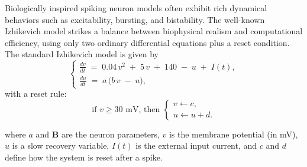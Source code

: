 Biologically inspired spiking neuron models often exhibit rich dynamical behaviors such as excitability, bursting, and bistability. The well-known Izhikevich model \cite{izhikevich2003simple} strikes a balance between biophysical realism and computational efficiency, using only two ordinary differential equations plus a reset condition. The standard Izhikevich model is given by
\begin{equation}
\begin{cases}
\displaystyle \frac{dv}{dt} \;=\; 0.04\,v^2 \;+\; 5\,v \;+\; 140 \;-\; u \;+\; I(t), \\[6pt]
\displaystyle \frac{du}{dt} \;=\; a\,\bigl(b\,v \;-\; u\bigr),
\end{cases}
\label{eq:izhikevich}
\end{equation}
with a reset rule:
\begin{equation}
\text{if } v \ge 30\text{ mV, then }
\begin{cases}
v \leftarrow c,\\
u \leftarrow u + d.
\end{cases}
\end{equation}

\noindent where $a$ and $\mathbf{B}$ are the neuron parameters, $v$ is the membrane potential (in mV), $u$ is a slow recovery variable, $I(t)$ is the external input current, and $c$ and $d$ define how the system is reset after a spike.





